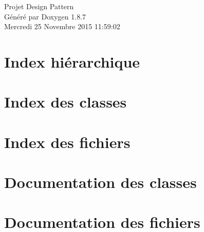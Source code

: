 \documentclass[twoside]{book}
\newcommand{\+}{\discretionary{\mbox{\scriptsize$\hookleftarrow$}}{}{}}
\newcommand{\clearemptydoublepage}{%
  \newpage{\pagestyle{empty}\cleardoublepage}%
}
\begin{document}
\hypersetup{pageanchor=false,
             bookmarks=true,
             bookmarksnumbered=true,
             pdfencoding=unicode
            }
\begin{titlepage}
\vspace*{7cm}
\begin{center}%
{\Large Projet Design Pattern }\\
\vspace*{1cm}
{\large Généré par Doxygen 1.8.7}\\
\vspace*{0.5cm}
{\small Mercredi 25 Novembre 2015 11:59:02}\\
\end{center}
\end{titlepage}
\clearemptydoublepage
\tableofcontents
\clearemptydoublepage
{}
\hypersetup{pageanchor=true}

\chapter{Index hiérarchique}

\chapter{Index des classes}

\chapter{Index des fichiers}

\chapter{Documentation des classes}


























\chapter{Documentation des fichiers}
























\newpage
{}
{}
\printindex
\end{document}
